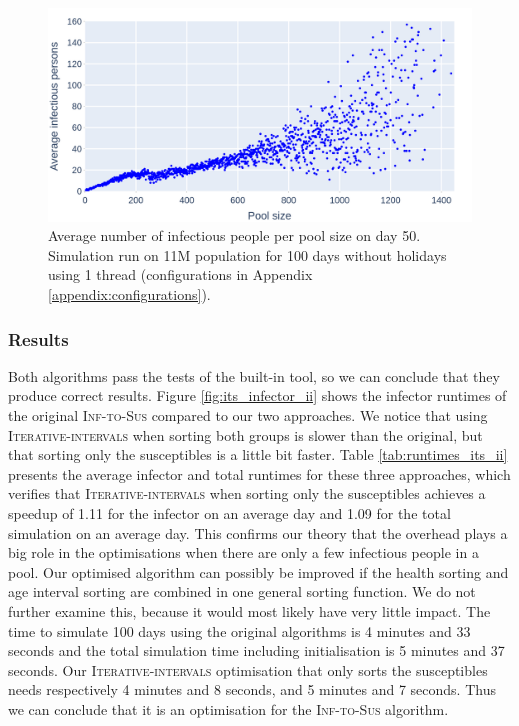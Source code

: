\begin{figure}
    \centering
    \includegraphics[width=\linewidth]{4 - Sampling/fig/inf_to_sus/infectious_distribution.png}
    \caption{Average number of infectious people per pool size on day 50. Simulation run on 11M population for 100 days without holidays using 1 thread (configurations in Appendix \ref{appendix:configurations}).}
    \label{fig:infectious_distribution}
\end{figure}

\subsubsection{Results}
Both algorithms pass the tests of the built-in tool, so we can conclude that they produce correct results. Figure \ref{fig:its_infector_ii} shows the infector runtimes of the original \textsc{Inf-to-Sus} compared to our two approaches. We notice that using \textsc{Iterative-intervals} when sorting both groups is slower than the original, but that sorting only the susceptibles is a little bit faster. Table \ref{tab:runtimes_its_ii} presents the average infector and total runtimes for these three approaches, which verifies that \textsc{Iterative-intervals} when sorting only the susceptibles achieves a speedup of 1.11 for the infector on an average day and 1.09 for the total simulation on an average day. This confirms our theory that the overhead plays a big role in the optimisations when there are only a few infectious people in a pool. Our optimised algorithm can possibly be improved if the health sorting and age interval sorting are combined in one general sorting function. We do not further examine this, because it would most likely have very little impact. The time to simulate 100 days using the original algorithms is 4 minutes and 33 seconds and the total simulation time including initialisation is 5 minutes and 37 seconds. Our \textsc{Iterative-intervals} optimisation that only sorts the susceptibles needs respectively 4 minutes and 8 seconds, and 5 minutes and 7 seconds. Thus we can conclude that it is an optimisation for the \textsc{Inf-to-Sus} algorithm.

